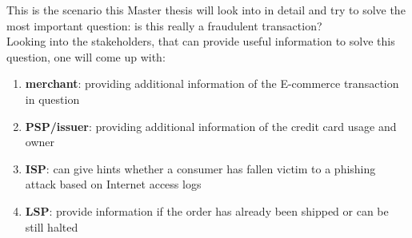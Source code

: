 This is the scenario this Master thesis will look into in detail and try to solve the most important question: is this really a fraudulent transaction? \\

Looking into the stakeholders, that can provide useful information to solve this question, one will come up with:\@

\begin{enumerate}
    \item \textbf{merchant}: providing additional information of the E-commerce transaction in question
    \item \textbf{\gls{PSP}/issuer}: providing additional information of the credit card usage and owner
    \item \textbf{\gls{ISP}}: can give hints whether a consumer has fallen victim to a phishing attack based on Internet access logs
    \item \textbf{\gls{LSP}}: provide information if the order has already been shipped or can be still halted
\end{enumerate}

